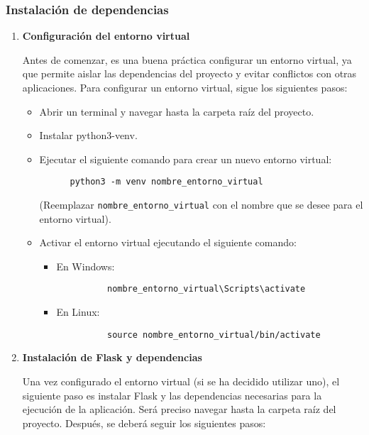 \subsubsection{\textbf{Instalación de dependencias}}

\begin{enumerate}
\item \textbf{Configuración del entorno virtual}


   Antes de comenzar, es una buena práctica configurar un entorno virtual, ya que permite aislar las dependencias del proyecto y evitar conflictos con otras aplicaciones. Para configurar un entorno virtual, sigue los siguientes pasos:

   \begin{itemize}
    \item Abrir un terminal y navegar hasta la carpeta raíz del proyecto.
    \item Instalar python3-venv.
    \item Ejecutar el siguiente comando para crear un nuevo entorno virtual:
      \begin{verbatim}
      python3 -m venv nombre_entorno_virtual
      \end{verbatim}
      (Reemplazar \texttt{nombre\_entorno\_virtual} con el nombre que se desee para el entorno virtual).
    \item Activar el entorno virtual ejecutando el siguiente comando:
      \begin{itemize}
        \item En Windows:
          \begin{verbatim}
          nombre_entorno_virtual\Scripts\activate
          \end{verbatim}
        \item En Linux:
          \begin{verbatim}
          source nombre_entorno_virtual/bin/activate
          \end{verbatim}
      \end{itemize}
  \end{itemize}

\item \textbf{Instalación de Flask y dependencias}    

   Una vez configurado el entorno virtual (si se ha decidido utilizar uno), el siguiente paso es instalar Flask y las dependencias necesarias para la ejecución de la aplicación. Será preciso navegar hasta la carpeta raíz del proyecto. Después, se deberá seguir los siguientes pasos:


\end{enumerate}
